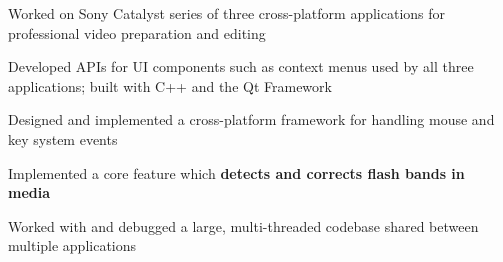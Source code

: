 \begin{cventries}
{\begin{cvitems}
        \item Worked on Sony Catalyst series of three cross-platform applications for professional video preparation and editing
        \item Developed APIs for UI components such as context menus used by all three applications; built with C++ and the Qt Framework
        \item Designed and implemented a cross-platform framework for handling mouse and key system events
        \item Implemented a core feature which \textbf{detects and corrects flash bands in media}
        \item Worked with and debugged a large, multi-threaded codebase shared between multiple applications
      \end{cvitems}
    }
\end{cventries}

